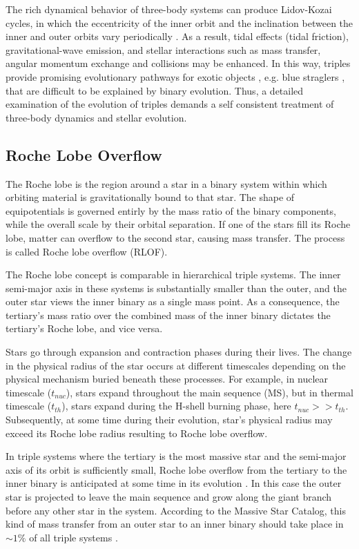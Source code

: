 The rich dynamical behavior of three-body systems can produce Lidov-Kozai cycles, in which the eccentricity of the inner orbit and the inclination between the inner and outer orbits vary periodically \citep{michaely2014secular,toonen2016evolution,mangipudi2022extreme}. As a result, tidal effects (tidal friction), gravitational-wave emission, and stellar interactions such as mass transfer, angular momentum exchange and collisions may be enhanced. In this way, triples provide promising evolutionary pathways for exotic objects \citep{sana2012binary, toonen2016evolution}, e.g. blue straglers \citep{winn2009spin}, that are difficult to be explained by binary evolution. Thus, a detailed examination of the evolution of triples demands a self consistent treatment of three-body dynamics and stellar evolution.

\subsection{Roche Lobe Overflow}

The Roche lobe is the region around a star in a binary system within which orbiting material is gravitationally bound to that star. The shape of equipotentials is governed entirly by the mass ratio of the binary components, while the overall scale by their orbital separation. If one of the stars fill its Roche lobe, matter can overflow to the second star, causing mass transfer. The process is called Roche lobe overflow (RLOF). 

The Roche lobe concept is comparable in hierarchical triple systems. The inner semi-major axis in these systems is substantially smaller than the outer, and the outer star views the inner binary as a single mass point. As a consequence, the tertiary's mass ratio over the combined mass of the inner binary dictates the tertiary's Roche lobe, and vice versa.

Stars go through expansion and contraction phases during their lives. The change in the physical radius of the star occurs at different timescales depending on the physical mechanism buried beneath these processes. For example, in nuclear timescale ($t_{nuc}$), stars expand throughout the main sequence (MS), but in thermal timescale ($t_{th}$), stars expand during the H-shell burning phase, here $t_{nuc} >> t_{th}$. Subsequently, at some time during their evolution, star's physical radius may exceed its Roche lobe radius resulting to Roche lobe overflow.

In triple systems where the tertiary is the most massive star and the semi-major axis of its orbit is sufficiently small, Roche lobe overflow from the tertiary to the inner binary is anticipated at some time in its evolution \citep{de2014evolution}. In this case the outer star is projected to leave the main sequence and grow along the giant branch before any other star in the system. According to the Massive Star Catalog, this kind of mass transfer from an outer star to an inner binary should take place in $ \sim 1\%$ of all triple systems \citep{de2014evolution,hamers2022statistical}. 

